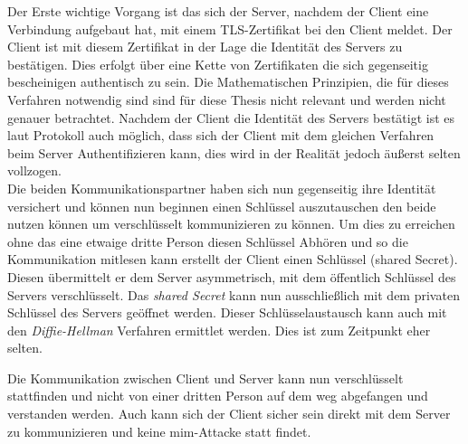 Der Erste wichtige Vorgang ist das sich der Server, nachdem der Client eine Verbindung aufgebaut hat, mit einem TLS-Zertifikat bei den Client meldet.
Der Client ist mit diesem Zertifikat in der Lage die Identität des Servers zu bestätigen.
Dies erfolgt über eine Kette von Zertifikaten die sich gegenseitig bescheinigen authentisch zu sein.
Die Mathematischen Prinzipien, die für dieses Verfahren notwendig sind sind für diese Thesis nicht relevant und werden nicht genauer betrachtet.
Nachdem der Client die Identität des Servers bestätigt ist es laut Protokoll auch möglich, dass sich der Client mit dem gleichen Verfahren beim Server Authentifizieren kann, dies wird in der Realität jedoch äußerst selten vollzogen.\\

Die beiden Kommunikationspartner haben sich nun gegenseitig ihre Identität versichert und können nun beginnen einen Schlüssel auszutauschen den beide nutzen können um verschlüsselt kommunizieren zu können.
Um dies zu erreichen ohne das eine etwaige dritte Person diesen Schlüssel Abhören und so die Kommunikation mitlesen kann erstellt der Client einen Schlüssel (shared Secret).
Diesen übermittelt er dem Server asymmetrisch, mit dem öffentlich Schlüssel des Servers verschlüsselt.
Das \textit{shared Secret} kann nun ausschließlich mit dem privaten Schlüssel des Servers geöffnet werden.
Dieser Schlüsselaustausch kann auch mit den \textit{Diffie-Hellman} Verfahren ermittlet werden.
Dies ist zum Zeitpunkt eher selten.

Die Kommunikation zwischen Client und Server kann nun verschlüsselt stattfinden und nicht von einer dritten Person auf dem weg abgefangen und verstanden werden.
Auch kann sich der Client sicher sein direkt mit dem Server zu kommunizieren und keine \ac{mim}-Attacke statt findet.

\pagebreak